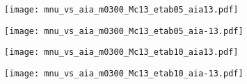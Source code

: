 \documentclass[a4paper,11pt]{article}
\begin{document}
\begin{figure}[!t]
        \begin{subfigure}[b]{0.25\textwidth}
            \centering
            \texttt{[image: mnu\_vs\_aia\_m0300\_Mc13\_etab05\_aia13.pdf]}
        \end{subfigure}
        \hspace{-.7\baselineskip}
        \begin{subfigure}[b]{0.25\textwidth}  
            \centering 
            \texttt{[image: mnu\_vs\_aia\_m0300\_Mc13\_etab05\_aia-13.pdf]}
        \end{subfigure}
        \hspace{-.7\baselineskip}
        \begin{subfigure}[b]{0.25\textwidth}
            \centering
            \texttt{[image: mnu\_vs\_aia\_m0300\_Mc13\_etab10\_aia13.pdf]}
        \end{subfigure}
        \hspace{-.7\baselineskip}
        \begin{subfigure}[b]{0.25\textwidth}  
            \centering 
            \texttt{[image: mnu\_vs\_aia\_m0300\_Mc13\_etab10\_aia-13.pdf]}
        \end{subfigure}


\end{figure}
\end{document}
